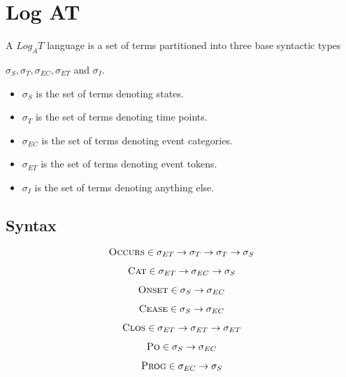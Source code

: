 \chapter{Log AT}

A $Log_A T$ language is a set of terms partitioned into three base syntactic types

$\sigma_S, \sigma_T, \sigma_{EC}, \sigma_{ET}$ and $ \sigma_I$.

\begin{itemize}
	\item $\sigma_S$ is the set of terms denoting states.
	\item $\sigma_T$ is the set of terms denoting time points.
	\item $\sigma_{EC}$ is the set of terms denoting event categories.
	\item $\sigma_{ET}$ is the set of terms denoting event tokens.
	\item $\sigma_I$ is the set of terms denoting anything else.
\end{itemize}


\section{Syntax}



\[
	\textsc{Occurs} \in \sigma_{ET} \to \sigma_T \to \sigma_T \to \sigma_S
\]

\[
	\textsc{Cat} \in \sigma_{ET} \to \sigma_{EC} \to \sigma_S
\]

\[
	\textsc{Onset} \in \sigma_S \to \sigma_{EC}
\]

\[
	\textsc{Cease} \in \sigma_S \to \sigma_{EC}
\]

\[
	\textsc{Clos} \in \sigma_{ET} \to \sigma_{ET} \to \sigma_{ET}
\]

\[
	\textsc{Po} \in \sigma_S \to \sigma_{EC}
\]

\[
	\textsc{Prog} \in \sigma_{EC} \to \sigma_S
\]



